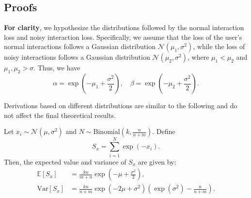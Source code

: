 
\subsection{Proofs}
\label{App:prof}

\textbf{For clarity}, we hypothesize the distributions followed by the normal interaction loss and noisy interaction loss. Specifically, we assume that the loss of the user's normal interactions follows a Gaussian distribution \( \mathcal{N}(\mu_1, \sigma^2) \), while the loss of noisy interactions follows a Gaussian distribution \( \mathcal{N}(\mu_2, \sigma^2) \), where \( \mu_1 < \mu_2 \) and \( \mu_1, \mu_2 > \sigma \). Thus, we have
\begin{equation*}
    \alpha = \exp\left(-\mu_1 + \frac{\sigma^2}{2}\right), 
                 \quad \beta = \exp\left(-\mu_2 + \frac{\sigma^2}{2}\right).
\end{equation*}


Derivations based on different distributions are similar to the following and do not affect the final theoretical results.


\begin{proposition}
\label{Pro:1}
    Let $x_i \sim \mathcal{N}(\mu, \sigma^2)$ and $N \sim \mathrm{Binomial}(k, \frac{n}{n+m})$. Define 
    \begin{equation*}
        S_x = \sum_{i=1}^N \exp(-x_i).
    \end{equation*}
    Then, the expected value and variance of $S_x$ are given by:
    \begin{equation*}
        \begin{aligned}
            \mathbb{E}[S_x] &= \frac{kn}{m+n} \exp\left(-\mu + \frac{\sigma^2}{2}\right), \\
            \mathrm{Var}[S_x] &= \frac{kn}{n+m} \exp(-2\mu + \sigma^2) \left( \exp(\sigma^2) - \frac{n}{n+m} \right).
        \end{aligned}
    \end{equation*}
\end{proposition}

